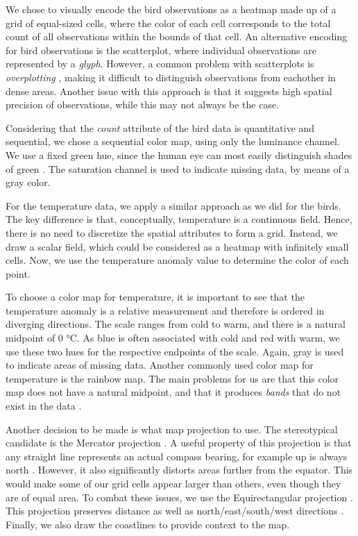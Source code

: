 \documentclass[journal]{vgtc}                %
\begin{document}
We chose to visually encode the bird observations as a heatmap \cite{munzner2014visualization} made up of a grid of equal-sized cells, where the color of each cell corresponds to the total count of all observations within the bounds of that cell. An alternative encoding for bird observations is the scatterplot, where individual observations are represented by a \emph{glyph}. However, a common problem with scatterplots is \emph{overplotting} \cite{micallef2017scatter}, making it difficult to distinguish observations from eachother in dense areas. Another issue with this approach is that it suggests high spatial precision of observations, while this may not always be the case.

Considering that the \emph{count} attribute of the bird data is quantitative and sequential, we chose a sequential color map, using only the luminance channel. We use a fixed green hue, since the human eye can most easily distinguish shades of green \cite{robinson1984fluorescent}. The saturation channel is used to indicate missing data, by means of a gray color.

For the temperature data, we apply a similar approach as we did for the birds. The key difference is that, conceptually, temperature is a continuous field. Hence, there is no need to discretize the spatial attributes to form a grid. Instead, we draw a scalar field, which could be considered as a heatmap with infinitely small cells. Now, we use the temperature anomaly value to determine the color of each point.

To choose a color map for temperature, it is important to see that the temperature anomaly is a relative measurement and therefore is ordered in diverging directions. The scale ranges from cold to warm, and there is a natural midpoint of 0 °C. As blue is often associated with cold and red with warm, we use these two hues for the respective endpoints of the scale. Again, gray is used to indicate areas of missing data. Another commonly used color map for temperature is the rainbow map. The main problems for us are that this color map does not have a natural midpoint, and that it produces \emph{bands} that do not exist in the data \cite{borland2007rainbow}.

Another decision to be made is what map projection to use. The stereotypical candidate is the Mercator projection \cite{monmonier2010mercator}. A useful property of this projection is that any straight line represents an actual compass bearing, for example up is always north \cite{kennedy2000projections}. However, it also significantly distorts areas further from the equator. This would make some of our grid cells appear larger than others, even though they are of equal area. To combat these issues, we use the Equirectangular projection \cite{miller1949equi}. This projection preserves distance as well as north/east/south/west directions \cite{kennedy2000projections}. Finally, we also draw the coastlines to provide context to the map.
\end{document}
